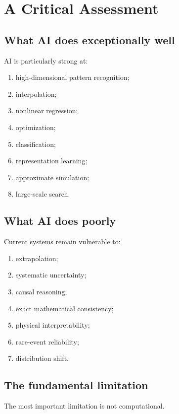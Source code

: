 \documentclass[11pt,a4paper,oneside]{book}
\begin{document}
\chapter{A Critical Assessment}

\section{What AI does exceptionally well}

AI is particularly strong at:

\begin{enumerate}
\item high-dimensional pattern recognition;
\item interpolation;
\item nonlinear regression;
\item optimization;
\item classification;
\item representation learning;
\item approximate simulation;
\item large-scale search.
\end{enumerate}

\section{What AI does poorly}

Current systems remain vulnerable to:

\begin{enumerate}
\item extrapolation;
\item systematic uncertainty;
\item causal reasoning;
\item exact mathematical consistency;
\item physical interpretability;
\item rare-event reliability;
\item distribution shift.
\end{enumerate}

\section{The fundamental limitation}

The most important limitation is not computational.
\end{document}
